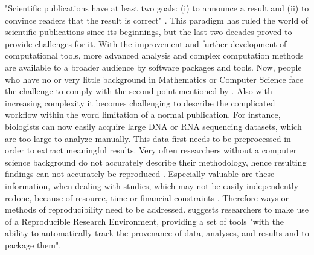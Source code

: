 "Scientific publications have at least two goals: (i) to announce a result and (ii) to convince readers that the result is correct" \citep{Mesirov2010}.
This paradigm has ruled the world of scientific publications since its beginnings, but the last two decades proved to provide challenges for it. With the improvement and further development of computational tools, more advanced analysis and complex computation methods are available to a broader audience by software packages and tools. Now, people who have no or very little background in Mathematics or Computer Science face the challenge to comply with the second point mentioned by \citeauthor{Mesirov2010}. Also with increasing complexity it becomes challenging to describe the complicated workflow within the word limitation of a normal publication.
For instance, biologists can now easily acquire large DNA or RNA sequencing datasets, which  are too large to analyze manually.
This data first needs to be preprocessed in order to extract meaningful results. %
Very often researchers without a computer science background do not accurately describe their methodology, hence resulting findings can not accurately be reproduced \citep{Peng2011}.
Especially valuable are these information, when dealing with studies, which may not be easily independently redone, because of resource, time or financial constraints \citep{Peng2011}.
 
Therefore ways or methods of reproducibility need to be  addressed. \citeauthor{Mesirov2010} suggests researchers to make use of a Reproducible Research Environment, providing a set of tools "with the ability to automatically track the provenance of data, analyses, and results and to package them".

